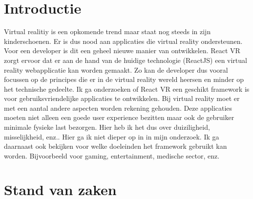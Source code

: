 \documentclass[fleqn,10pt]{voorstel}
\affiliation{\textbf{Contact:}
  \href{mailto:michiel.glibert.w2493@student.hogent.be}
  {michiel.glibert.w2493@student.hogent.be}}
\begin{document}
\flushbottom %
\maketitle %
\tableofcontents %
\thispagestyle{empty} %



\section{Introductie} %
\label{sec:introductie}

Virtual realitiy is een opkomende trend maar staat nog steeds in zijn kinderschoenen. Er is dus nood aan applicaties die virtual reality ondersteunen. Voor een developer is dit een geheel nieuwe manier van ontwikkelen. React VR zorgt ervoor dat er aan de hand van de huidige technologie (ReactJS) een virtual reality webapplicatie kan worden gemaakt. Zo kan de developer dus vooral focussen op de principes die er in de virtual reality wereld heersen en minder op het technische gedeelte. Ik ga onderzoeken of React VR een geschikt framework is voor gebruiksvriendelijke applicaties te ontwikkelen. Bij virtual reality moet er met een aantal andere aspecten worden rekening gehouden. Deze applicaties moeten niet alleen een goede user experience bezitten maar ook de gebruiker minimale fysieke last bezorgen. Hier heb ik het dus over duiziligheid, misselijkheid, enz.. Hier ga ik niet dieper op in in mijn onderzoek. Ik ga daarnaast ook bekijken voor welke doeleinden het framework gebruikt kan worden. Bijvoorbeeld voor gaming, entertainment, medische sector, enz.


\section{Stand van zaken}
\label{sec:state-of-the-art}
\end{document}
